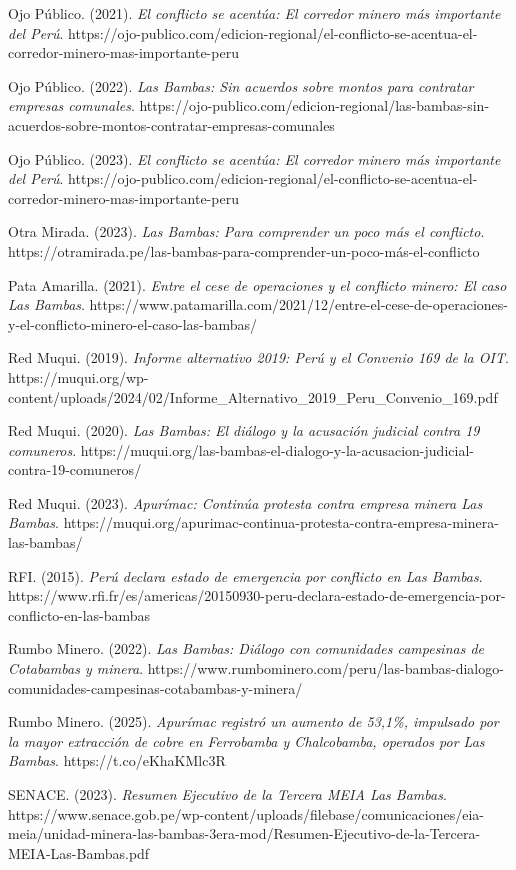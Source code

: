 \documentclass[
  stu,
  floatsintext,
  longtable,
  a4paper,
  nolmodern,
  notxfonts,
  notimes,
  colorlinks=true,linkcolor=blue,citecolor=blue,urlcolor=blue]{apa7}
\begin{document}
Ojo Público. (2021). \emph{El conflicto se acentúa: El corredor minero
más importante del Perú}.
https://ojo-publico.com/edicion-regional/el-conflicto-se-acentua-el-corredor-minero-mas-importante-peru

Ojo Público. (2022). \emph{Las Bambas: Sin acuerdos sobre montos para
contratar empresas comunales}.
https://ojo-publico.com/edicion-regional/las-bambas-sin-acuerdos-sobre-montos-contratar-empresas-comunales

Ojo Público. (2023). \emph{El conflicto se acentúa: El corredor minero
más importante del Perú}.
https://ojo-publico.com/edicion-regional/el-conflicto-se-acentua-el-corredor-minero-mas-importante-peru

Otra Mirada. (2023). \emph{Las Bambas: Para comprender un poco más el
conflicto}.
https://otramirada.pe/las-bambas-para-comprender-un-poco-más-el-conflicto

Pata Amarilla. (2021). \emph{Entre el cese de operaciones y el conflicto
minero: El caso Las Bambas}.
https://www.patamarilla.com/2021/12/entre-el-cese-de-operaciones-y-el-conflicto-minero-el-caso-las-bambas/

Red Muqui. (2019). \emph{Informe alternativo 2019: Perú y el Convenio
169 de la OIT}.
https://muqui.org/wp-content/uploads/2024/02/Informe\_Alternativo\_2019\_Peru\_Convenio\_169.pdf

Red Muqui. (2020). \emph{Las Bambas: El diálogo y la acusación judicial
contra 19 comuneros}.
https://muqui.org/las-bambas-el-dialogo-y-la-acusacion-judicial-contra-19-comuneros/

Red Muqui. (2023). \emph{Apurímac: Continúa protesta contra empresa
minera Las Bambas}.
https://muqui.org/apurimac-continua-protesta-contra-empresa-minera-las-bambas/

RFI. (2015). \emph{Perú declara estado de emergencia por conflicto en
Las Bambas}.
https://www.rfi.fr/es/americas/20150930-peru-declara-estado-de-emergencia-por-conflicto-en-las-bambas

Rumbo Minero. (2022). \emph{Las Bambas: Diálogo con comunidades
campesinas de Cotabambas y minera}.
https://www.rumbominero.com/peru/las-bambas-dialogo-comunidades-campesinas-cotabambas-y-minera/

Rumbo Minero. (2025). \emph{Apurímac registró un aumento de 53,1\%,
impulsado por la mayor extracción de cobre en Ferrobamba y Chalcobamba,
operados por Las Bambas}. https://t.co/eKhaKMlc3R

SENACE. (2023). \emph{Resumen Ejecutivo de la Tercera MEIA Las Bambas}.
https://www.senace.gob.pe/wp-content/uploads/filebase/comunicaciones/eia-meia/unidad-minera-las-bambas-3era-mod/Resumen-Ejecutivo-de-la-Tercera-MEIA-Las-Bambas.pdf
\end{document}
